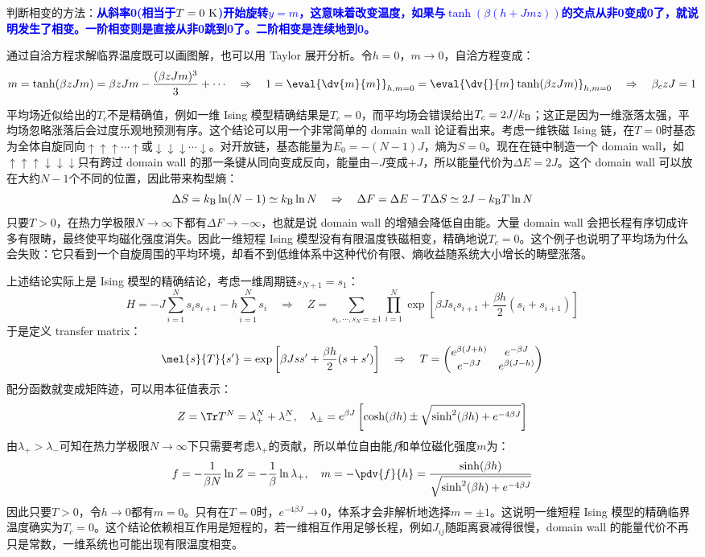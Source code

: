 判断相变的方法：\textcolor{blue}{\textbf{从斜率0(相当于$T=0 \ \rm K$)开始旋转$y=m$，这意味着改变温度，如果与$\tanh(\beta(h+Jmz))$的交点从非0变成0了，就说明发生了相变。一阶相变则是直接从非0跳到0了。二阶相变是连续地到0。}}

通过自洽方程求解临界温度既可以画图解，也可以用 Taylor 展开分析。令$h=0$，$m\to0$，自洽方程变成：
\[m=\tanh(\beta zJm)=\beta zJm-\frac{(\beta zJm)^3}{3}+\cdots \quad \Rightarrow \quad 1=\eval{\dv{m}{m}}_{h,m=0}=\eval{\dv{}{m}\tanh(\beta zJm)}_{h,m=0}\quad\Rightarrow\quad \beta_c zJ=1\]

平均场近似给出的$T_c$不是精确值，例如一维 Ising 模型精确结果是$T_c=0$，而平均场会错误给出$T_c=2J/k_{\rm B}$；这正是因为一维涨落太强，平均场忽略涨落后会过度乐观地预测有序。这个结论可以用一个非常简单的 domain wall 论证看出来。考虑一维铁磁 Ising 链，在$T=0$时基态为全体自旋同向$\uparrow\uparrow\uparrow\cdots\uparrow$或$\downarrow\downarrow\downarrow\cdots\downarrow$。对开放链，基态能量为$E_0=-(N-1)J$，熵为$S=0$。现在在链中制造一个 domain wall，如$\uparrow\uparrow\uparrow\downarrow\downarrow\downarrow$只有跨过 domain wall 的那一条键从同向变成反向，能量由$-J$变成$+J$，所以能量代价为$\Delta E=2J$。这个 domain wall 可以放在大约$N-1$个不同的位置，因此带来构型熵：
\[\Delta S = k_{\rm B}\ln (N-1) \simeq k_{\rm B}\ln N \quad \Rightarrow \quad \Delta F=\Delta E-T\Delta S\simeq 2J-k_{\rm B}T\ln N\]
只要$T>0$，在热力学极限$N\to\infty$下都有$\Delta F\to-\infty$，也就是说 domain wall 的增殖会降低自由能。大量 domain wall 会把长程有序切成许多有限畴，最终使平均磁化强度消失。因此一维短程 Ising 模型没有有限温度铁磁相变，精确地说$T_c=0$。这个例子也说明了平均场为什么会失败：它只看到一个自旋周围的平均环境，却看不到低维体系中这种代价有限、熵收益随系统大小增长的畴壁涨落。

上述结论实际上是 Ising 模型的精确结论，考虑一维周期链$s_{N+1}=s_1$：
\[H=-J\sum_{i=1}^{N}s_is_{i+1}-h\sum_{i=1}^{N}s_i \quad \Rightarrow \quad Z=\sum_{s_1,\cdots,s_N=\pm1}\prod_{i=1}^{N}\exp\left[\beta Js_is_{i+1}+\frac{\beta h}{2}(s_i+s_{i+1})\right]\]
于是定义 transfer matrix：
\[\mel{s}{T}{s'}=\exp\left[\beta Jss'+\frac{\beta h}{2}(s+s')\right] \quad \Rightarrow \quad T=\begin{pmatrix}
e^{\beta(J+h)} & e^{-\beta J}\\
e^{-\beta J} & e^{\beta(J-h)}
\end{pmatrix}\]
配分函数就变成矩阵迹，可以用本征值表示：
\[Z=\Tr T^N=\lambda_+^N+\lambda_-^N, \quad \lambda_\pm=e^{\beta J}\left[\cosh(\beta h)\pm\sqrt{\sinh^2(\beta h)+e^{-4\beta J}}\right]\]
由$\lambda_+>\lambda_-$可知在热力学极限$N \to \infty$下只需要考虑$\lambda_+$的贡献，所以单位自由能$f$和单位磁化强度$m$为：
\[f=-\frac{1}{\beta N}\ln Z=-\frac{1}{\beta}\ln\lambda_+, \quad m=-\pdv{f}{h}=\frac{\sinh(\beta h)}{\sqrt{\sinh^2(\beta h)+e^{-4\beta J}}}\]
因此只要$T>0$，令$h\to0$都有$m=0$。只有在$T=0$时，$e^{-4\beta J}\to0$，体系才会非解析地选择$m=\pm1$。这说明一维短程 Ising 模型的精确临界温度确实为$T_c=0$。这个结论依赖相互作用是短程的，若一维相互作用足够长程，例如$J_{ij}$随距离衰减得很慢，domain wall 的能量代价不再只是常数，一维系统也可能出现有限温度相变。

